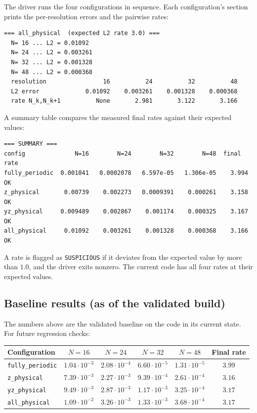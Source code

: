 \documentclass[11pt]{article}
\begin{document}
The driver runs the four configurations in sequence.  Each
configuration's section prints the per-resolution errors and the
pairwise rates:

\begin{verbatim}
=== all_physical  (expected L2 rate 3.0) ===
  N= 16 ... L2 = 0.01092
  N= 24 ... L2 = 0.003261
  N= 32 ... L2 = 0.001328
  N= 48 ... L2 = 0.000368
  resolution                16          24          32          48
  L2 error             0.01092    0.003261    0.001328    0.000368
  rate N_k,N_k+1          None       2.981       3.122       3.166
\end{verbatim}

A summary table compares the measured final rates against their
expected values:

\begin{verbatim}
=== SUMMARY ===
config              N=16        N=24        N=32        N=48  final rate
fully_periodic  0.001041   0.0002078   6.597e-05   1.306e-05    3.994   OK
z_physical       0.00739    0.002273   0.0009391    0.000261    3.158   OK
yz_physical     0.009489    0.002867    0.001174    0.000325    3.167   OK
all_physical     0.01092    0.003261    0.001328    0.000368    3.166   OK
\end{verbatim}

A rate is flagged as \texttt{SUSPICIOUS} if it deviates from the
expected value by more than $1.0$, and the driver exits nonzero.
The current code has all four rates at their expected values.

\subsection{Baseline results (as of the validated build)}

The numbers above are the validated baseline on the code in its
current state. For future regression checks:

\begin{center}
\begin{tabular}{lcccc|c}
\toprule
Configuration       & $N=16$   & $N=24$    & $N=32$    & $N=48$    & Final rate \\
\midrule
\texttt{fully\_periodic} & $1.04\cdot10^{-3}$ & $2.08\cdot10^{-4}$ &
  $6.60\cdot10^{-5}$ & $1.31\cdot10^{-5}$ & $3.99$ \\
\texttt{z\_physical} & $7.39\cdot10^{-3}$ & $2.27\cdot10^{-3}$ &
  $9.39\cdot10^{-4}$ & $2.61\cdot10^{-4}$ & $3.16$ \\
\texttt{yz\_physical} & $9.49\cdot10^{-3}$ & $2.87\cdot10^{-3}$ &
  $1.17\cdot10^{-3}$ & $3.25\cdot10^{-4}$ & $3.17$ \\
\texttt{all\_physical} & $1.09\cdot10^{-2}$ & $3.26\cdot10^{-3}$ &
  $1.33\cdot10^{-3}$ & $3.68\cdot10^{-4}$ & $3.17$ \\
\bottomrule
\end{tabular}
\end{center}
\end{document}

